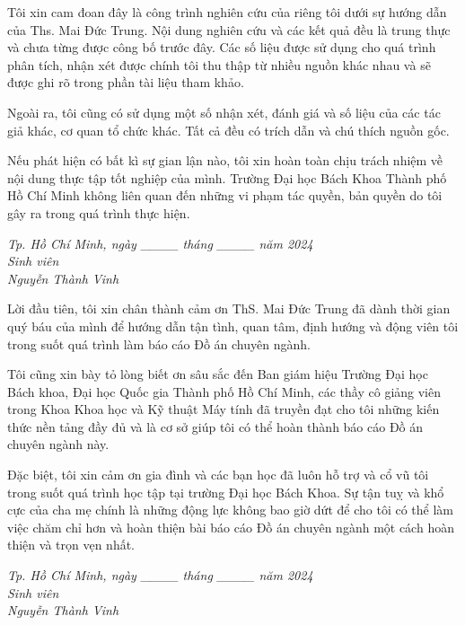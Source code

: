 \documentclass[12pt,a4paper,oneside]{book} %
\begin{document}
\begin{declaration}
Tôi xin cam đoan đây là công trình nghiên cứu của riêng tôi dưới sự hướng dẫn của Ths. Mai Đức Trung. Nội dung nghiên cứu và các kết quả đều là trung thực và chưa từng được công bố trước đây. Các số liệu được sử dụng cho quá trình phân tích, nhận xét được chính tôi thu thập từ nhiều nguồn khác nhau và sẽ được ghi rõ trong phần tài liệu tham khảo.

Ngoài ra, tôi cũng có sử dụng một số nhận xét, đánh giá và số liệu của các tác giả khác, cơ quan tổ chức khác. Tất cả đều có trích dẫn và chú thích nguồn gốc.

Nếu phát hiện có bất kì sự gian lận nào, tôi xin hoàn toàn chịu trách nhiệm về nội dung thực tập tốt nghiệp của mình. Trường Đại học Bách Khoa Thành phố Hồ Chí Minh không liên quan đến những vi phạm tác quyền, bản quyền do tôi gây ra trong quá trình thực hiện.

\begin{flushright}
\textit{Tp. Hồ Chí Minh, ngày ____ tháng ____ năm 2024\\}
\textit{Sinh viên\\}
\textit{Nguyễn Thành Vinh}

\end{flushright}
\end{declaration}



\begin{acknowledgments}
Lời đầu tiên, tôi xin chân thành cảm ơn ThS. Mai Đức Trung đã dành thời gian quý báu của mình để hướng dẫn tận tình, quan tâm, định hướng và động viên tôi trong suốt quá trình làm báo cáo Đồ án chuyên ngành.

Tôi cũng xin bày tỏ lòng biết ơn sâu sắc đến Ban giám hiệu Trường Đại học Bách khoa, Đại học Quốc gia Thành phố Hồ Chí Minh, các thầy cô giảng viên trong Khoa Khoa học và Kỹ thuật Máy tính đã truyền đạt cho tôi những kiến thức nền tảng đầy đủ và là cơ sở giúp tôi có thể hoàn thành báo cáo Đồ án chuyên ngành này.

Đặc biệt, tôi xin cảm ơn gia đình và các bạn học đã luôn hỗ trợ và cổ vũ tôi trong suốt quá trình học tập tại trường Đại học Bách Khoa. Sự tận tuỵ và khổ cực của cha mẹ chính là những động lực không bao giờ dứt để cho tôi có thể làm việc chăm chỉ hơn và hoàn thiện bài báo cáo Đồ án chuyên ngành một cách hoàn thiện và trọn vẹn nhất.
\begin{flushright}
\textit{Tp. Hồ Chí Minh, ngày ____ tháng ____ năm 2024\\}
\textit{Sinh viên\\}
\textit{Nguyễn Thành Vinh}
\end{flushright}
\end{acknowledgments}
\end{document}
